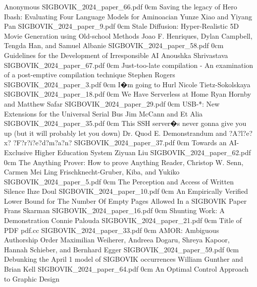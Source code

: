 	{Anonymous}
	{}
	{SIGBOVIK_2024_paper_66.pdf}
	{0cm}
	{}
\addpaper
	{Saving the legacy of Hero Ibash: Evaluating Four Language Models for Aminoacian}
	{Yunze Xiao and Yiyang Pan}
	{}
	{SIGBOVIK_2024_paper_9.pdf}
	{0cm}
	{}
\addpaper
	{Stale Diffusion: Hyper-Realistic 5D Movie Generation using Old-school Methods}
	{Joao F. Henriques, Dylan Campbell, Tengda Han, and Samuel Albanie}
	{}
	{SIGBOVIK_2024_paper_58.pdf}
	{0cm}
	{}
\addpaper
	{Guidelines for the Development of Irresponsible AI}
	{Anoushka Shrivastava}
	{}
	{SIGBOVIK_2024_paper_67.pdf}
	{0cm}
	{}
\addpaper
	{Just-too-late compilation - An examination of a post-emptive compilation technique}
	{Stephen Rogers}
	{}
	{SIGBOVIK_2024_paper_3.pdf}
	{0cm}
	{}
\addpaper
	{I�m going to Hurl}
	{Nicole Tietz-Sokolskaya}
	{}
	{SIGBOVIK_2024_paper_18.pdf}
	{0cm}
	{}
\addpaper
	{We Have Serverless at Home}
	{Ryan Hornby and Matthew Safar}
	{}
	{SIGBOVIK_2024_paper_29.pdf}
	{0cm}
	{}
\addpaper
	{USB-*: New Extensions for the Universal Serial Bus}
	{Jim McCann and Et Alia}
	{}
	{SIGBOVIK_2024_paper_35.pdf}
	{0cm}
	{}
\addpaper
	{This SSH server�s never gonna give you up (but it will probably let you down)}
	{Dr. Quod E. Demonstrandum and  ?A?l?e?x? ?F?r?i?e?d?m?a?n?}
	{}
	{SIGBOVIK_2024_paper_37.pdf}
	{0cm}
	{}
\addpaper
	{Towards an AI-Exclusive Higher Education System}
	{Ziyuan Liu}
	{}
	{SIGBOVIK_2024_paper_62.pdf}
	{0cm}
	{}
\addpaper
	{The Anything Prover: How to prove Anything}
	{Reader, Christop W. Senn, Carmen Mei Ling Frischknecht-Gruber, Kiba, and Yukiko}
	{}
	{SIGBOVIK_2024_paper_5.pdf}
	{0cm}
	{}
\addpaper
	{The Perception and Access of Written Silence}
	{Ihze Doul}
	{}
	{SIGBOVIK_2024_paper_10.pdf}
	{0cm}
	{}
\addpaper
	{An Empirically Verified Lower Bound for The Number Of Empty Pages Allowed In a SIGBOVIK Paper}
	{Frans Skarman}
	{}
	{SIGBOVIK_2024_paper_16.pdf}
	{0cm}
	{}
\addpaper
	{Shunting Work: A Demonstration}
	{Connie Palouda}
	{}
	{SIGBOVIK_2024_paper_21.pdf}
	{0cm}
	{}
\addpaper
	{Title of PDF}
	{pdf.cc}
	{}
	{SIGBOVIK_2024_paper_33.pdf}
	{0cm}
	{}
\addpaper
	{AMOR: Ambiguous Authorship Order}
	{Maximilian Weiherer, Andreea Dogaru, Shreya Kapoor, Hannah Schieber, and Bernhard Egger}
	{}
	{SIGBOVIK_2024_paper_59.pdf}
	{0cm}
	{}
\addpaper
	{Debunking the April 1 model of SIGBOVIK occurrences}
	{William Gunther and Brian Kell}
	{}
	{SIGBOVIK_2024_paper_64.pdf}
	{0cm}
	{}
\addpaper
	{An Optimal Control Approach to Graphic Design}
